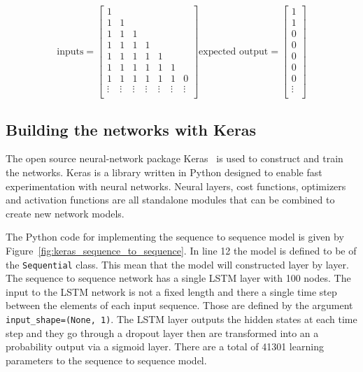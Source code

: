 \begin{equation}\label{eq:sequence_to_probability_inputs_outputs_example}
    \text{inputs} =
    \begin{bmatrix}
        1 &  &  \\
        1 & 1 &  \\
        1 & 1 & 1 \\
        1 & 1 & 1 & 1 \\
        1 & 1 & 1 & 1 & 1 \\
        1 & 1 & 1 & 1 & 1 & 1\\
        1 & 1 & 1 & 1 & 1 & 1 & 0 \\
        \vdots & \vdots & \vdots & \vdots & \vdots & \vdots & \vdots \\
    \end{bmatrix}
    \text{expected output} =
    \begin{bmatrix}
        1 \\
        1 \\
        0 \\
        0 \\
        0 \\
        0 \\
        0 \\
        \vdots \\
    \end{bmatrix}
\end{equation}

\subsection{Building the networks with Keras}

The open source neural-network package Keras~\cite{Chollet2015} is used to
construct and train the networks. Keras is a library written in Python designed
to enable fast experimentation with neural networks. Neural layers, cost
functions, optimizers and activation functions are all standalone modules that
can be combined to create new network models.

The Python code for implementing the sequence to sequence model is given by
Figure~\ref{fig:keras_sequence_to_sequence}. In line 12 the model is defined to
be of the \texttt{Sequential} class. This mean that the model will
constructed layer by layer. The sequence to sequence network has a single LSTM
layer with 100 nodes. The input to the LSTM network is not a fixed length
and there a single time step between the elements of each input sequence.
Those are defined by the argument \texttt{input_shape=(None, 1)}.
The LSTM layer outputs the hidden states at each time step and they go through
a dropout layer then are transformed into an a probability output via a
sigmoid layer. There are a total of 41301 learning parameters to the sequence
to sequence model.

